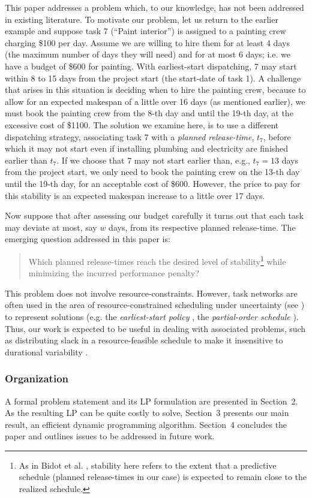 

This paper addresses a problem which, to our knowledge, has not been addressed in existing literature.
To motivate our problem, let us return to the earlier example and suppose task 7 
(``Paint interior'') is assigned to a painting crew charging \$100 per day.
Assume we are willing to hire them for at least 4 days (the maximum number of days they will need) and for at most 6 days; i.e. we have a budget of \$600 for painting.
With earliest-start dispatching, 7 may start within 8 to 15 days from the project start (the start-date of task 1).
A challenge that arises in this situation is deciding when to hire the painting crew,
because to allow for an expected makespan of a little over 16 days (as mentioned earlier),
we must book the painting crew from the 8-th day and until the 19-th day, at the excessive cost of \$1100.
The solution we examine here, is to use a different dispatching strategy,
associating task 7 with a \emph{planned release-time}, $t_7$, 
before which it may not start even if installing plumbing and electricity are finished earlier than $t_7$.
If we choose that 7 may not start earlier than, e.g., $t_7 = 13$ days from the project start,
we only need to book the painting crew on the 13-th day until the 19-th day, for an acceptable cost of \$600.
However, the price to pay for this stability is an expected makespan increase to a little over 17 days.

Now suppose that after assessing our budget carefully it turns out that each task may deviate at most, say $w$ days, from its respective planned release-time.
The emerging question addressed in this paper is:
\begin{quote}
	Which planned release-times reach the desired level of stability\footnote{As in Bidot et al. \cite{bidot2009}, stability here refers to the extent that a predictive schedule (planned release-times in our case) is expected to remain close to the realized schedule.}
	while minimizing the incurred performance penalty?
\end{quote}

This problem does not involve resource-constraints.
However, task networks are often used in the area of resource-constrained scheduling under uncertainty (see \cite{beck2002,herroelen2005})
to represent solutions (e.g. the \emph{earliest-start policy} \cite{igelmund1983}, the \emph{partial-order schedule} \cite{policella2004,godard2005,bonfietti2014}).
Thus, our work is expected to be useful in dealing with associated problems,
such as distributing slack in a resource-feasible schedule to make it insensitive to durational variability \cite{davenport2014}.

\subsubsection*{Organization}
A formal problem statement and its LP formulation are presented in Section~2. 
As the resulting LP can be quite costly to solve,
Section~3 presents our main result, an efficient dynamic programming algorithm.
Section~4 concludes the paper and outlines issues to be addressed in future work.

